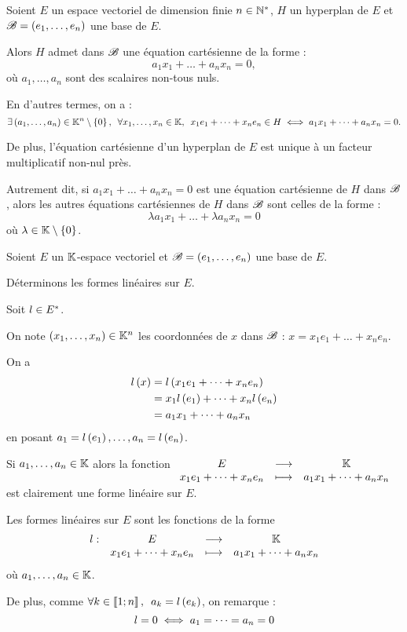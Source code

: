 \begin{prop}
Soient \(E\) un espace vectoriel de dimension finie \(n\in\mathbb{N}^*\), \(H\) un hyperplan de \(E\) et \(\mathscr{B}=\left(e_1,\dots,e_n\right)\) une base de \(E\).

Alors \(H\) admet dans \(\mathscr{B}\) une équation cartésienne de la forme : \[a_1x_1+\dots+a_nx_n=0,\] où \(a_1,\dots,a_n\) sont des scalaires non-tous nuls.

En d'autres termes, on a : \[\quantifs{\exists\paren{a_1,\dots,a_n}\in\K^n\excluant\accol{0};\forall x_1,\dots,x_n\in\K}x_1e_1+\dots+x_ne_n\in H\ssi a_1x_1+\dots+a_nx_n=0.\]

De plus, l'équation cartésienne d'un hyperplan de \(E\) est unique à un facteur multiplicatif non-nul près.

Autrement dit, si \(a_1x_1+\dots+a_nx_n=0\) est une équation cartésienne de \(H\) dans \(\mathscr{B}\), alors les autres équations cartésiennes de \(H\) dans \(\mathscr{B}\) sont celles de la forme : \[\lambda a_1x_1+\dots+\lambda a_nx_n=0\] où \(\lambda\in\mathbb{K}\setminus\left\lbrace0\right\rbrace\).
\end{prop}

\begin{rem}
Soient \(E\) un \(\mathbb{K}\)-espace vectoriel et \(\mathscr{B}=\left(e_1,\dots,e_n\right)\) une base de \(E\).

Déterminons les formes linéaires sur \(E\).

\analyse

Soit \(l\in E^{*}\).

On note \(\left(x_1,\dots,x_n\right)\in\mathbb{K}^n\) les coordonnées de \(x\) dans \(\mathscr{B}\) : \(x=x_1e_1+\dots+x_ne_n\).

On a \[\begin{aligned}
l\left(x\right)&=l\left(x_1e_1+\dots+x_ne_n\right) \\
&=x_1l\left(e_1\right)+\dots+x_nl\left(e_n\right) \\
&=a_1x_1+\dots+a_nx_n
\end{aligned}\] en posant \(a_1=l\left(e_1\right),\dots,a_n=l\left(e_n\right)\).

\synthese

Si \(a_1,\dots,a_n\in\mathbb{K}\) alors la fonction \(\begin{array}[t]{ccc}E & \longrightarrow & \mathbb{K} \\ x_1e_1+\dots+x_ne_n & \longmapsto & a_1x_1+\dots+a_nx_n\end{array}\) est clairement une forme linéaire sur \(E\).

\conclusion

Les formes linéaires sur \(E\) sont les fonctions de la forme \[\begin{array}[t]{cccc}l : & E & \longrightarrow & \mathbb{K} \\ & x_1e_1+\dots+x_ne_n & \longmapsto & a_1x_1+\dots+a_nx_n\end{array}\] où \(a_1,\dots,a_n\in\mathbb{K}\).

De plus, comme \(\quantifs{\forall k\in\interventierii{1}{n}}a_k=l\paren{e_k}\), on remarque : \[l=0\iff a_1=\dots=a_n=0\]
\end{rem}

